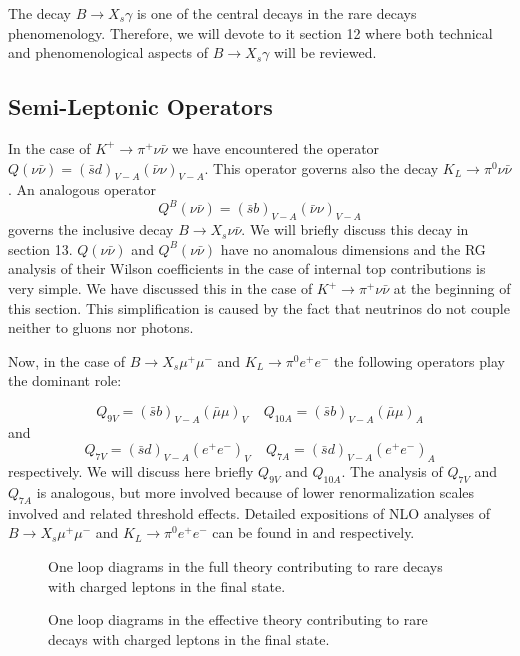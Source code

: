 \documentclass[12pt]{article}
\newcommand{\be}{\begin{equation}}
\newcommand{\ee}{\end{equation}}
\def\kpn{K^+\rightarrow\pi^+\nu\bar\nu}
\begin{document}
\begin{itemize}
\begin{itemize}
The decay $B\to X_s\gamma$ is one of the central decays in the
rare decays phenomenology.
Therefore, we will devote to it  section 12 where both
technical and phenomenological aspects of $B\to X_s\gamma$ will be
reviewed.
\subsection{Semi-Leptonic Operators}
In the case of $\kpn$ we have encountered the operator
$Q(\nu\bar\nu)=(\bar sd)_{V-A}(\bar\nu\nu)_{V-A}$. This operator
governs also the decay $K_L\to\pi^0\nu\bar\nu$. An analogous operator 
\be
Q^B(\nu\bar\nu)=(\bar sb)_{V-A}(\bar\nu\nu)_{V-A}
\ee
governs the inclusive decay $B\to X_s\nu\bar\nu$. We will briefly discuss
this decay in section 13.
$Q(\nu\bar\nu)$ and $Q^B(\nu\bar\nu)$ have no anomalous dimensions and
the RG analysis of their Wilson coefficients in the case of internal top
contributions is very simple. We have
discussed this in the case of $\kpn$ at the beginning of this section.
This simplification is caused by the fact that neutrinos do not couple
neither to gluons nor photons. 

Now, in the case of $B \to X_s \mu^+\mu^-$ and $K_L\to \pi^0 e^+e^-$
the following operators play the dominant role:

\begin{equation}\label{9V}
Q_{9V}  = (\bar s b  )_{V-A} (\bar \mu\mu)_{V}~~~~~
Q_{10A}  = (\bar s b )_{V-A} (\bar \mu\mu)_{A}
\end{equation}
and
\be\label{9VS}
Q_{7V}  = (\bar s d  )_{V-A} (e^+e^-)_{V}~~~~~
Q_{7A}  = (\bar s d )_{V-A} (e^+e^-)_{A}
\end{equation}
respectively. We will discuss here briefly $Q_{9V}$ and $Q_{10A}$. The
analysis of $Q_{7V}$ and $Q_{7A}$ is analogous, but more involved
because of lower
renormalization scales involved and related threshold effects.
Detailed expositions of NLO analyses of 
$B \to X_s \mu^+\mu^-$ and $K_L\to \pi^0 e^+e^-$ can be found in
\cite{Mis:94,BuMu:94}  and \cite{BLMM} respectively.

\begin{figure}[hbt]
\vspace{0.10in}
\centerline{
\epsfysize=1.5in
}%
\vspace{0.08in}
\caption[]{One loop diagrams in the full theory contributing to rare decays
with charged leptons in the final state.
\label{L:17}}
\end{figure}

\begin{figure}[hbt]
\vspace{0.10in}
\centerline{
\epsfysize=1.5in
}%
\vspace{0.08in}
\caption[]{One loop diagrams in the effective theory contributing to 
rare decays with charged leptons in the final state.
\label{L:18}}
\end{figure}


\end{itemize}
\end{itemize}
\end{document}
